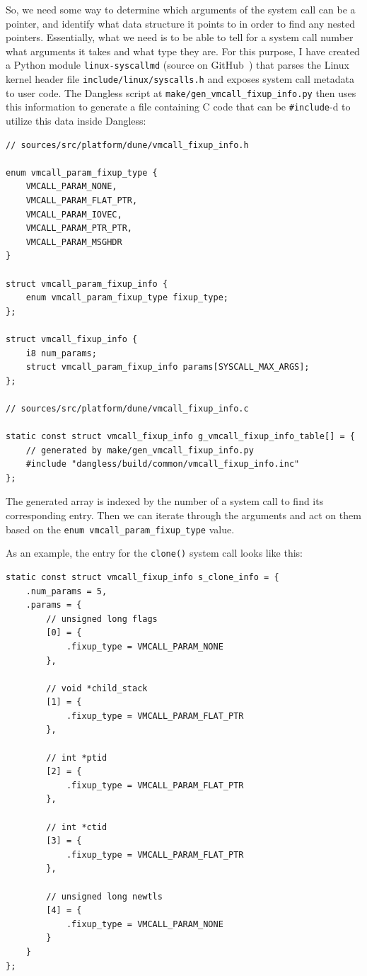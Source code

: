 So, we need some way to determine which arguments of the system call can be a pointer, and identify what data structure it points to in order to find any nested pointers. Essentially, what we need is to be able to tell for a system call number what arguments it takes and what type they are. For this purpose, I have created a Python module \texttt{linux-syscallmd} (source on GitHub~\cite{github-linux-syscallmd}) that parses the Linux kernel header file \texttt{include/linux/syscalls.h} and exposes system call metadata to user code. The Dangless script at \texttt{make/gen\_vmcall\_fixup\_info.py} then uses this information to generate a file containing C code that can be \lstinline!#include!-d to utilize this data inside Dangless:

\begin{lstlisting}
// sources/src/platform/dune/vmcall_fixup_info.h

enum vmcall_param_fixup_type {
	VMCALL_PARAM_NONE,
	VMCALL_PARAM_FLAT_PTR,
	VMCALL_PARAM_IOVEC,
	VMCALL_PARAM_PTR_PTR,
	VMCALL_PARAM_MSGHDR
}

struct vmcall_param_fixup_info {
	enum vmcall_param_fixup_type fixup_type;
};

struct vmcall_fixup_info {
	i8 num_params;
	struct vmcall_param_fixup_info params[SYSCALL_MAX_ARGS];
};

// sources/src/platform/dune/vmcall_fixup_info.c

static const struct vmcall_fixup_info g_vmcall_fixup_info_table[] = {
	// generated by make/gen_vmcall_fixup_info.py
	#include "dangless/build/common/vmcall_fixup_info.inc"
};
\end{lstlisting}

The generated array is indexed by the number of a system call to find its corresponding entry. Then we can iterate through the arguments and act on them based on the \lstinline!enum vmcall_param_fixup_type! value.

As an example, the entry for the \lstinline!clone()! system call looks like this:

\begin{lstlisting}
static const struct vmcall_fixup_info s_clone_info = {
	.num_params = 5,
	.params = {
		// unsigned long flags
		[0] = {
			.fixup_type = VMCALL_PARAM_NONE
		},
		
		// void *child_stack
		[1] = {
			.fixup_type = VMCALL_PARAM_FLAT_PTR
		},
		
		// int *ptid
		[2] = {
			.fixup_type = VMCALL_PARAM_FLAT_PTR
		},
		
		// int *ctid
		[3] = {
			.fixup_type = VMCALL_PARAM_FLAT_PTR
		},
		
		// unsigned long newtls
		[4] = {
			.fixup_type = VMCALL_PARAM_NONE
		}
	}
};
\end{lstlisting}

